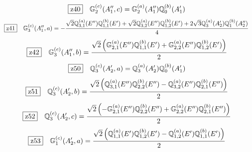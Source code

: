\documentclass[fleqn,10pt,landscape]{jsarticle}
\begin{document}
\begin{dmath*}
\hspace*{3mm}\fbox{z40}\quad \mathbb{G}_{2}^{(c)}(A_{1}^{\prime\prime},c)=\mathbb{G}_{2}^{(a)}(A_{1}^{\prime\prime}) \mathbb{Q}_{0}^{(b)}(A_{1}^{\prime})
\end{dmath*}
\begin{dmath*}
\hspace*{3mm}\fbox{z41}\quad \mathbb{G}_{3}^{(c)}(A_{1}^{\prime\prime},a)=- \frac{\sqrt{2} \mathbb{Q}_{3,1}^{(a)}(E^{\prime\prime}) \mathbb{Q}_{1,1}^{(b)}(E^{\prime}) + \sqrt{2} \mathbb{Q}_{3,2}^{(a)}(E^{\prime\prime}) \mathbb{Q}_{1,2}^{(b)}(E^{\prime}) + 2 \sqrt{3} \mathbb{Q}_{3}^{(a)}(A_{2}^{\prime}) \mathbb{Q}_{1}^{(b)}(A_{2}^{\prime\prime})}{4}
\end{dmath*}
\begin{dmath*}
\hspace*{3mm}\fbox{z42}\quad \mathbb{G}_{3}^{(c)}(A_{1}^{\prime\prime},b)=\frac{\sqrt{2} \left(\mathbb{G}_{2,1}^{(a)}(E^{\prime\prime}) \mathbb{Q}_{1,1}^{(b)}(E^{\prime}) + \mathbb{G}_{2,2}^{(a)}(E^{\prime\prime}) \mathbb{Q}_{1,2}^{(b)}(E^{\prime})\right)}{2}
\end{dmath*}
\begin{dmath*}
\hspace*{3mm}\fbox{z50}\quad \mathbb{Q}_{3}^{(c)}(A_{2}^{\prime},a)=\mathbb{Q}_{3}^{(a)}(A_{2}^{\prime}) \mathbb{Q}_{0}^{(b)}(A_{1}^{\prime})
\end{dmath*}
\begin{dmath*}
\hspace*{3mm}\fbox{z51}\quad \mathbb{Q}_{3}^{(c)}(A_{2}^{\prime},b)=\frac{\sqrt{2} \left(\mathbb{Q}_{3,1}^{(a)}(E^{\prime\prime}) \mathbb{Q}_{2,2}^{(b)}(E^{\prime\prime}) - \mathbb{Q}_{3,2}^{(a)}(E^{\prime\prime}) \mathbb{Q}_{2,1}^{(b)}(E^{\prime\prime})\right)}{2}
\end{dmath*}
\begin{dmath*}
\hspace*{3mm}\fbox{z52}\quad \mathbb{Q}_{3}^{(c)}(A_{2}^{\prime},c)=\frac{\sqrt{2} \left(- \mathbb{G}_{2,1}^{(a)}(E^{\prime\prime}) \mathbb{Q}_{2,2}^{(b)}(E^{\prime\prime}) + \mathbb{G}_{2,2}^{(a)}(E^{\prime\prime}) \mathbb{Q}_{2,1}^{(b)}(E^{\prime\prime})\right)}{2}
\end{dmath*}
\begin{dmath*}
\hspace*{3mm}\fbox{z53}\quad \mathbb{G}_{1}^{(c)}(A_{2}^{\prime},a)=\frac{\sqrt{2} \left(\mathbb{Q}_{1,1}^{(a)}(E^{\prime}) \mathbb{Q}_{1,2}^{(b)}(E^{\prime}) - \mathbb{Q}_{1,2}^{(a)}(E^{\prime}) \mathbb{Q}_{1,1}^{(b)}(E^{\prime})\right)}{2}
\end{dmath*}
\end{document}
